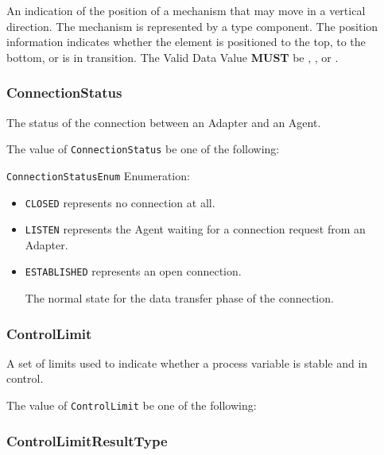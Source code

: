 An indication of the position of a mechanism that may move in a vertical direction. The mechanism is represented by a  type component. 
 The position information indicates whether the  element is positioned to the top, to the bottom, or is in transition.  
 The \gls{Valid Data Value} \textbf{MUST} be , , or .


\subsubsection{ConnectionStatus}
\label{sec:ConnectionStatus}



The status of the connection between an \gls{Adapter} and an \gls{Agent}.


The value of \texttt{ConnectionStatus} \MUST be one of the following: 


\texttt{ConnectionStatusEnum} Enumeration:

\begin{itemize}
\item \texttt{CLOSED} \newline represents no connection at all. 
\item \texttt{LISTEN} \newline represents the \gls{Agent} waiting for a connection request from an \gls{Adapter}. 
\item \texttt{ESTABLISHED} \newline represents an open connection.

The normal state for the data transfer phase of the connection. 
\end{itemize}

\FloatBarrier

\subsubsection{ControlLimit}
\label{sec:ControlLimit}



A set of limits used to indicate whether a process variable is stable and in control.


The value of \texttt{ControlLimit} \MUST be one of the following: 

\FloatBarrier

\subsubsection{ControlLimitResultType}
\label{sec:ControlLimitResultType}






